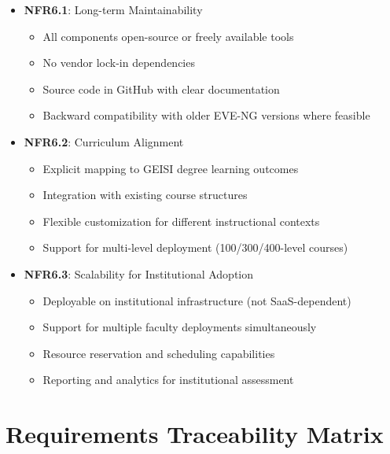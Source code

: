 \begin{itemize}

\item \textbf{NFR6.1}: Long-term Maintainability
\begin{itemize}
\item All components open-source or freely available tools
\item No vendor lock-in dependencies
\item Source code in GitHub with clear documentation
\item Backward compatibility with older EVE-NG versions where feasible
\end{itemize}

\item \textbf{NFR6.2}: Curriculum Alignment
\begin{itemize}
\item Explicit mapping to GEISI degree learning outcomes
\item Integration with existing course structures
\item Flexible customization for different instructional contexts
\item Support for multi-level deployment (100/300/400-level courses)
\end{itemize}

\item \textbf{NFR6.3}: Scalability for Institutional Adoption
\begin{itemize}
\item Deployable on institutional infrastructure (not SaaS-dependent)
\item Support for multiple faculty deployments simultaneously
\item Resource reservation and scheduling capabilities
\item Reporting and analytics for institutional assessment
\end{itemize}

\end{itemize}

\section{Requirements Traceability Matrix}

